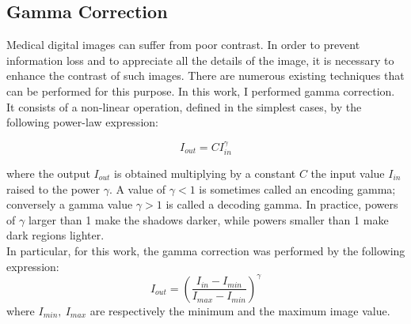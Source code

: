 \documentclass{standalone}
\begin{document}
\subsection{Gamma Correction}

Medical digital images can suffer from poor contrast\cite{gammacorr1}. 
In order to prevent information loss and to appreciate all the details of the image, it is necessary to enhance the contrast of such images. 
There are numerous existing techniques that can be performed for this purpose.
In this work, I performed gamma correction.
\\
It consists of a non-linear operation, defined in the simplest cases, by the following power-law expression:

\begin{equation}
    I_{out} = C I_{in}^{\gamma}
\end{equation}

where the output $I_{out}$ is obtained multiplying by a constant $C$ the input value $I_{in}$ raised to the power $\gamma$.
A value of $\gamma < 1$ is sometimes called an encoding gamma; conversely a gamma value $\gamma > 1$ is called a decoding gamma.
In practice, powers of $\gamma$ larger than 1 make the shadows darker, while powers smaller than 1 make dark regions lighter.
\\
In particular, for this work, the gamma correction was performed by the following expression: 
\begin{equation}
    I_{out} =  (\frac{I_{in} - I_{min}}{I_{max} - I_{min}})^{\gamma}
\end{equation}
where $I_{min}, \: I_{max}$ are respectively the minimum and the maximum image value.
\end{document}
